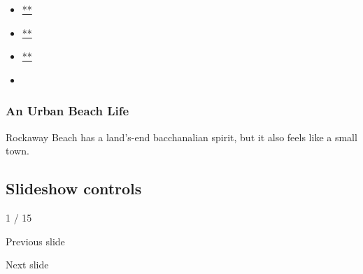\begin{itemize}
\item
  \href{https://www.facebook.com/sharer.php?app_id=9869919170\&u=https\%3A\%2F\%2Fwww.nytimes.com\%2Fslideshow\%2F2020\%2F07\%2F31\%2Frealestate\%2Fan-urban-beach-life.html\%3Fsmid\%3Dfb-share\&name=An\%20Urban\%20Beach\%20Life\&redirect_uri=https\%3A\%2F\%2Fwww.facebook.com\%2F}{**}
\item
  \href{https://twitter.com/intent/tweet?url=https\%3A\%2F\%2Fwww.nytimes.com\%2Fslideshow\%2F2020\%2F07\%2F31\%2Frealestate\%2Fan-urban-beach-life.html\%3Fsmid\%3Dtw-share\&text=An\%20Urban\%20Beach\%20Life}{**}
\item
  \href{mailto:?subject=NYTimes.com\%3A\%20An\%20Urban\%20Beach\%20Life\&body=From\%20The\%20New\%20York\%20Times\%3A\%0A\%0AAn\%20Urban\%20Beach\%20Life\%0A\%0ARockaway\%20Beach\%20has\%20a\%20land\%E2\%80\%99s-end\%20bacchanalian\%20spirit\%2C\%20but\%20it\%20also\%20feels\%20like\%20a\%20small\%20town.\%0A\%0Ahttps\%3A\%2F\%2Fwww.nytimes.com\%2Fslideshow\%2F2020\%2F07\%2F31\%2Frealestate\%2Fan-urban-beach-life.html\%3Fsmid\%3Dem-share}{**}
\item
\end{itemize}

\hypertarget{an-urban-beach-life-1}{%
\subsubsection{An Urban Beach Life}\label{an-urban-beach-life-1}}

Rockaway Beach has a land's-end bacchanalian spirit, but it also feels
like a small town.

\hypertarget{slideshow-controls}{%
\subsection{Slideshow controls}\label{slideshow-controls}}

1 / 15

Previous slide

Next slide
